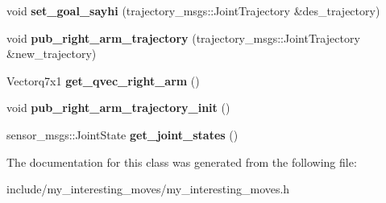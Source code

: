 \begin{DoxyCompactItemize}
\item 
\hypertarget{class_my__interesting__moves_a5a5e85c417832f083ffc87516a27b0e7}{void {\bfseries set\-\_\-goal\-\_\-sayhi} (trajectory\-\_\-msgs\-::\-Joint\-Trajectory \&des\-\_\-trajectory)}\label{class_my__interesting__moves_a5a5e85c417832f083ffc87516a27b0e7}

\item 
\hypertarget{class_my__interesting__moves_ae6aa5cdf8dcc5ecb0815c9e8b7cce1e0}{void {\bfseries pub\-\_\-right\-\_\-arm\-\_\-trajectory} (trajectory\-\_\-msgs\-::\-Joint\-Trajectory \&new\-\_\-trajectory)}\label{class_my__interesting__moves_ae6aa5cdf8dcc5ecb0815c9e8b7cce1e0}

\item 
\hypertarget{class_my__interesting__moves_aee29d1cffa39b632a7a498af43974961}{Vectorq7x1 {\bfseries get\-\_\-qvec\-\_\-right\-\_\-arm} ()}\label{class_my__interesting__moves_aee29d1cffa39b632a7a498af43974961}

\item 
\hypertarget{class_my__interesting__moves_ab372adb58a3b615a3e3fc4e6104aee7d}{void {\bfseries pub\-\_\-right\-\_\-arm\-\_\-trajectory\-\_\-init} ()}\label{class_my__interesting__moves_ab372adb58a3b615a3e3fc4e6104aee7d}

\item 
\hypertarget{class_my__interesting__moves_a9ec17aef9b2fb277ae00e63906895f03}{sensor\-\_\-msgs\-::\-Joint\-State {\bfseries get\-\_\-joint\-\_\-states} ()}\label{class_my__interesting__moves_a9ec17aef9b2fb277ae00e63906895f03}

\end{DoxyCompactItemize}


The documentation for this class was generated from the following file\-:\begin{DoxyCompactItemize}
\item 
include/my\-\_\-interesting\-\_\-moves/my\-\_\-interesting\-\_\-moves.\-h\end{DoxyCompactItemize}
